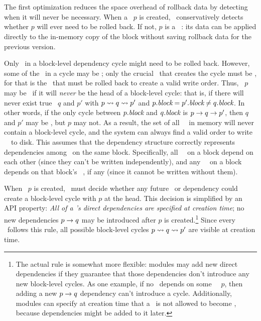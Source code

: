 
\subsection{\Nrb\ \Patches}
\label{sec:patch:nrb}

The first optimization reduces the space overhead of rollback data by
detecting when it will never be necessary.
%
When a \patch\ $p$ is created, \Kudos\ conservatively detects whether $p$
will ever need to be rolled back.
%
If not, $p$ is a \emph{\nrb\ \patch}: its data can be applied
directly to the in-memory copy of the block without saving rollback data
for the previous version.


Only \patches\ in a block-level dependency cycle might need to be rolled
back.
%
However, some of the \patches\ in a cycle may be \nrb; only the crucial
\patch\ that creates the cycle must be \rb, for that is the \patch\ that
must be rolled back to create a valid write order.
%
Thus, \patch\ $p$ may be \nrb\ if it will \emph{never} be the head of a
block-level cycle: that is, if there will never exist true \patches\ $q$
and $p'$ with $p \leadsto q \leadsto p'$ and $p.\textit{block} = p'.\textit{block}
\neq q.\textit{block}$.
%
In other words, if the only cycle between $p.\textit{block}$ and $q.\textit{block}$ is $p
\rightarrow q \rightarrow p'$, then $q$ and $p'$ may be \nrb, but $p$ may
not.
%
As a result, the set of all \nrb\ \patches\ in memory will never contain
a block-level cycle, and the system can always find a valid order to
write \nrb\ \patches\ to disk.
%
This assumes that the dependency structure correctly represents
dependencies among \patches\ on the same block.
%
Specifically, all \nrb\ \patches\ on a block depend on each other (since
they can't be written independently), and any \rb\ \patch\ on a block
depends on that block's \nrb\ \patches, if any (since it cannot be written
without them).


When \patch\ $p$ is created, \Kudos\ must decide whether any future
\patch\ or dependency could create a block-level cycle with $p$ at the
head.
%
This decision is simplified by an API property: \emph{All of a \patch's
direct dependencies are specified at creation time};
%
no new dependencies $p \rightarrow q$ may be introduced after $p$ is
created.\footnote{The actual rule is somewhat more flexible: modules may add
  new direct dependencies if they guarantee that those dependencies
  don't introduce any new block-level cycles.  As one example, if no
  \patch\ depends on some \noop\ \patch\ $p$, then adding a new $p
  \rightarrow q$ dependency can't introduce a cycle.  Additionally,
  modules can specify at creation time that a \patch\ is not allowed to
  become \nrb, because dependencies might be added to it later.}
%
Since every \patch\ follows this rule, all possible block-level cycles $p
\leadsto q \leadsto p'$ are visible at creation time.


